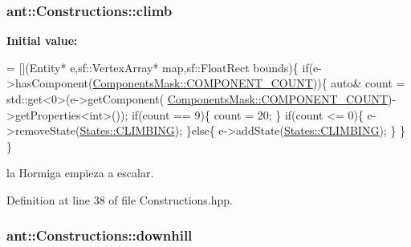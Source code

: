 \hypertarget{classant_1_1_constructions_a4c51e8694bc83487513a763e8c474535}{
\subsubsection[{climb}]{ ant\+::\+Constructions\+::climb\hspace{0.3cm}{\ttfamily [static]}}}\label{classant_1_1_constructions_a4c51e8694bc83487513a763e8c474535}
{\bfseries Initial value\+:}
\begin{DoxyCode}
= [](Entity* e,sf::VertexArray* map,sf::FloatRect bounds)\{
        \textcolor{keywordflow}{if}(e->hasComponent(\hyperlink{class_components_mask_a7a90217e6d5da07c838e12fe2f355448}{ComponentsMask::COMPONENT\_COUNT}))\{
            \textcolor{keyword}{auto}& count = std::get<0>(e->getComponent(
      \hyperlink{class_components_mask_a7a90217e6d5da07c838e12fe2f355448}{ComponentsMask::COMPONENT\_COUNT})->getProperties<\textcolor{keywordtype}{int}>());
            \textcolor{keywordflow}{if}(count == 9)\{
                count = 20;
            \}
            \textcolor{keywordflow}{if}(count <= 0)\{
                e->removeState(\hyperlink{class_states_a1a5a36f0f204d9dda0ebd0a09b6fd7fe}{States::CLIMBING});
            \}\textcolor{keywordflow}{else}\{
                e->addState(\hyperlink{class_states_a1a5a36f0f204d9dda0ebd0a09b6fd7fe}{States::CLIMBING});
            \}
        \}
    \}
\end{DoxyCode}


la Hormiga empieza a escalar. 



Definition at line 38 of file Constructions.\+hpp.

\hypertarget{classant_1_1_constructions_a763c8e75cc3802706c8bf329879a6553}{
\subsubsection[{downhill}]{ ant\+::\+Constructions\+::downhill\hspace{0.3cm}{\ttfamily [static]}}}\label{classant_1_1_constructions_a763c8e75cc3802706c8bf329879a6553}


